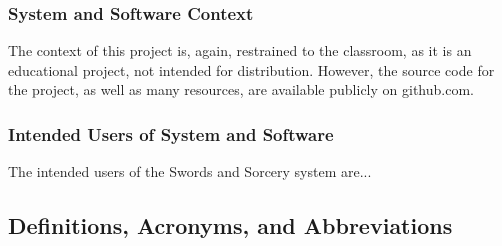 \documentclass[12pt,a4paper]{article}
\begin{document}
\subsubsection{System and Software Context}
The context of this project is, again, restrained to the classroom, as it is an educational project, not intended for distribution. However, the source code for the project, as well as many resources, are available publicly on github.com. 
\subsubsection{Intended Users of System and Software}
The intended users of the Swords and Sorcery system are...
\subsection{Definitions, Acronyms, and Abbreviations}
\end{document}
